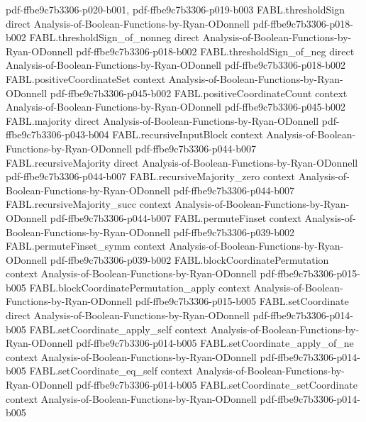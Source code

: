 \begin{theorem}
  {pdf-ffbe9c7b3306-p020-b001,
    pdf-ffbe9c7b3306-p019-b003}
\proofstep
  {FABL.thresholdSign}
  {direct}
  {Analysis-of-Boolean-Functions-by-Ryan-ODonnell}
  {pdf-ffbe9c7b3306-p018-b002}
\proofstep
  {FABL.thresholdSign_of_nonneg}
  {direct}
  {Analysis-of-Boolean-Functions-by-Ryan-ODonnell}
  {pdf-ffbe9c7b3306-p018-b002}
\proofstep
  {FABL.thresholdSign_of_neg}
  {direct}
  {Analysis-of-Boolean-Functions-by-Ryan-ODonnell}
  {pdf-ffbe9c7b3306-p018-b002}
\proofstep
  {FABL.positiveCoordinateSet}
  {context}
  {Analysis-of-Boolean-Functions-by-Ryan-ODonnell}
  {pdf-ffbe9c7b3306-p045-b002}
\proofstep
  {FABL.positiveCoordinateCount}
  {context}
  {Analysis-of-Boolean-Functions-by-Ryan-ODonnell}
  {pdf-ffbe9c7b3306-p045-b002}
\proofstep
  {FABL.majority}
  {direct}
  {Analysis-of-Boolean-Functions-by-Ryan-ODonnell}
  {pdf-ffbe9c7b3306-p043-b004}
\proofstep
  {FABL.recursiveInputBlock}
  {context}
  {Analysis-of-Boolean-Functions-by-Ryan-ODonnell}
  {pdf-ffbe9c7b3306-p044-b007}
\proofstep
  {FABL.recursiveMajority}
  {direct}
  {Analysis-of-Boolean-Functions-by-Ryan-ODonnell}
  {pdf-ffbe9c7b3306-p044-b007}
\proofstep
  {FABL.recursiveMajority_zero}
  {context}
  {Analysis-of-Boolean-Functions-by-Ryan-ODonnell}
  {pdf-ffbe9c7b3306-p044-b007}
\proofstep
  {FABL.recursiveMajority_succ}
  {context}
  {Analysis-of-Boolean-Functions-by-Ryan-ODonnell}
  {pdf-ffbe9c7b3306-p044-b007}
\proofstep
  {FABL.permuteFinset}
  {context}
  {Analysis-of-Boolean-Functions-by-Ryan-ODonnell}
  {pdf-ffbe9c7b3306-p039-b002}
\proofstep
  {FABL.permuteFinset_symm}
  {context}
  {Analysis-of-Boolean-Functions-by-Ryan-ODonnell}
  {pdf-ffbe9c7b3306-p039-b002}
\proofstep
  {FABL.blockCoordinatePermutation}
  {context}
  {Analysis-of-Boolean-Functions-by-Ryan-ODonnell}
  {pdf-ffbe9c7b3306-p015-b005}
\proofstep
  {FABL.blockCoordinatePermutation_apply}
  {context}
  {Analysis-of-Boolean-Functions-by-Ryan-ODonnell}
  {pdf-ffbe9c7b3306-p015-b005}
\proofstep
  {FABL.setCoordinate}
  {direct}
  {Analysis-of-Boolean-Functions-by-Ryan-ODonnell}
  {pdf-ffbe9c7b3306-p014-b005}
\proofstep
  {FABL.setCoordinate_apply_self}
  {context}
  {Analysis-of-Boolean-Functions-by-Ryan-ODonnell}
  {pdf-ffbe9c7b3306-p014-b005}
\proofstep
  {FABL.setCoordinate_apply_of_ne}
  {context}
  {Analysis-of-Boolean-Functions-by-Ryan-ODonnell}
  {pdf-ffbe9c7b3306-p014-b005}
\proofstep
  {FABL.setCoordinate_eq_self}
  {context}
  {Analysis-of-Boolean-Functions-by-Ryan-ODonnell}
  {pdf-ffbe9c7b3306-p014-b005}
\proofstep
  {FABL.setCoordinate_setCoordinate}
  {context}
  {Analysis-of-Boolean-Functions-by-Ryan-ODonnell}
  {pdf-ffbe9c7b3306-p014-b005}

\end{theorem}
